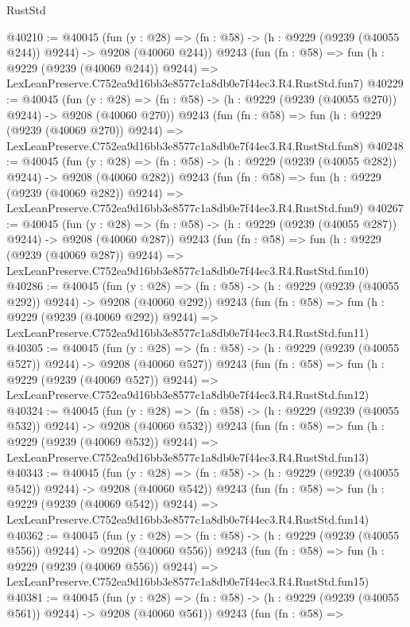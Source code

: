 \begin{lexlean}{RustStd}
\begin{coremodule}
@40210 := @40045
    (fun (y : @28) => (fn : @58) -> (h : @9229 (@9239 (@40055 @244)) @9244) -> @9208 (@40060 @244))
    @9243
    (fun (fn : @58) =>
    fun (h : @9229 (@9239 (@40069 @244)) @9244) =>
    LexLeanPreserve.C752ea9d16bb3e8577c1a8db0e7f44ec3.R4.RustStd.fun7)
@40229 := @40045
    (fun (y : @28) => (fn : @58) -> (h : @9229 (@9239 (@40055 @270)) @9244) -> @9208 (@40060 @270))
    @9243
    (fun (fn : @58) =>
    fun (h : @9229 (@9239 (@40069 @270)) @9244) =>
    LexLeanPreserve.C752ea9d16bb3e8577c1a8db0e7f44ec3.R4.RustStd.fun8)
@40248 := @40045
    (fun (y : @28) => (fn : @58) -> (h : @9229 (@9239 (@40055 @282)) @9244) -> @9208 (@40060 @282))
    @9243
    (fun (fn : @58) =>
    fun (h : @9229 (@9239 (@40069 @282)) @9244) =>
    LexLeanPreserve.C752ea9d16bb3e8577c1a8db0e7f44ec3.R4.RustStd.fun9)
@40267 := @40045
    (fun (y : @28) => (fn : @58) -> (h : @9229 (@9239 (@40055 @287)) @9244) -> @9208 (@40060 @287))
    @9243
    (fun (fn : @58) =>
    fun (h : @9229 (@9239 (@40069 @287)) @9244) =>
    LexLeanPreserve.C752ea9d16bb3e8577c1a8db0e7f44ec3.R4.RustStd.fun10)
@40286 := @40045
    (fun (y : @28) => (fn : @58) -> (h : @9229 (@9239 (@40055 @292)) @9244) -> @9208 (@40060 @292))
    @9243
    (fun (fn : @58) =>
    fun (h : @9229 (@9239 (@40069 @292)) @9244) =>
    LexLeanPreserve.C752ea9d16bb3e8577c1a8db0e7f44ec3.R4.RustStd.fun11)
@40305 := @40045
    (fun (y : @28) => (fn : @58) -> (h : @9229 (@9239 (@40055 @527)) @9244) -> @9208 (@40060 @527))
    @9243
    (fun (fn : @58) =>
    fun (h : @9229 (@9239 (@40069 @527)) @9244) =>
    LexLeanPreserve.C752ea9d16bb3e8577c1a8db0e7f44ec3.R4.RustStd.fun12)
@40324 := @40045
    (fun (y : @28) => (fn : @58) -> (h : @9229 (@9239 (@40055 @532)) @9244) -> @9208 (@40060 @532))
    @9243
    (fun (fn : @58) =>
    fun (h : @9229 (@9239 (@40069 @532)) @9244) =>
    LexLeanPreserve.C752ea9d16bb3e8577c1a8db0e7f44ec3.R4.RustStd.fun13)
@40343 := @40045
    (fun (y : @28) => (fn : @58) -> (h : @9229 (@9239 (@40055 @542)) @9244) -> @9208 (@40060 @542))
    @9243
    (fun (fn : @58) =>
    fun (h : @9229 (@9239 (@40069 @542)) @9244) =>
    LexLeanPreserve.C752ea9d16bb3e8577c1a8db0e7f44ec3.R4.RustStd.fun14)
@40362 := @40045
    (fun (y : @28) => (fn : @58) -> (h : @9229 (@9239 (@40055 @556)) @9244) -> @9208 (@40060 @556))
    @9243
    (fun (fn : @58) =>
    fun (h : @9229 (@9239 (@40069 @556)) @9244) =>
    LexLeanPreserve.C752ea9d16bb3e8577c1a8db0e7f44ec3.R4.RustStd.fun15)
@40381 := @40045
    (fun (y : @28) => (fn : @58) -> (h : @9229 (@9239 (@40055 @561)) @9244) -> @9208 (@40060 @561))
    @9243
    (fun (fn : @58) =>

\end{coremodule}
\end{lexlean}
